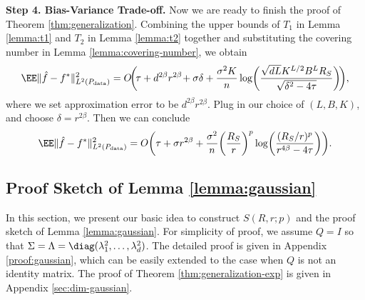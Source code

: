 \textbf{Step 4. Bias-Variance Trade-off.}
Now we are ready to finish the proof of Theorem \ref{thm:generalization}. Combining the upper bounds of $T_1$ in Lemma \ref{lemma:t1} and $T_2$ in Lemma \ref{lemma:t2} together and substituting the covering number in  Lemma \ref{lemma:covering-number}, we obtain
\begin{align*}
\EE \norm{ \hat{f} - f^*}^2_{L^2(P_{\rm data})} 
        =  O \!\biggl(\! \tau + d^{2\beta} r^{2\beta} \!+\sigma\delta+  \frac{\sigma^2 K}{n} \log\biggl( \frac{ \sqrt{dL} K^{L/2} B^L R_S }{\sqrt{\delta^2-4\tau}}  \biggr)\!\biggr),
\end{align*}
where we set approximation error to be $d^{2\beta} r^{2\beta}$. 
Plug in our choice of $(L,B,K)$, and choose $\delta = r^{2\beta}$. Then we can conclude
\begin{align*}
    \EE \norm{ \hat{f} - f^*}^2_{L^2(P_{\rm data})} =  O\biggl(   \tau +  \sigma r^{2\beta} 
    +\frac{\sigma^2}{n} \biggl(\frac{R_S}{r} \biggr)^p \log\biggl( \frac{(R_S/r)^p}{ r^{4\beta}-4\tau}\biggr) \biggr).
\end{align*}




\subsection{Proof Sketch of Lemma \ref{lemma:gaussian}}\label{sec:gaussian}

In this section, we present our basic idea to construct $S(R,r;p)$
and the proof sketch of Lemma \ref{lemma:gaussian}. For simplicity of proof, we assume $Q=I$ so that $\Sigma=\Lambda=\diag(\lambda_1^2,\ldots,\lambda_d^2)$. The detailed proof is given in Appendix \ref{proof:gaussian}, which can be easily extended to the case when $Q$ is not an identity matrix. The proof of Theorem \ref{thm:generalization-exp} is given in Appendix \ref{sec:dim-gaussian}.

